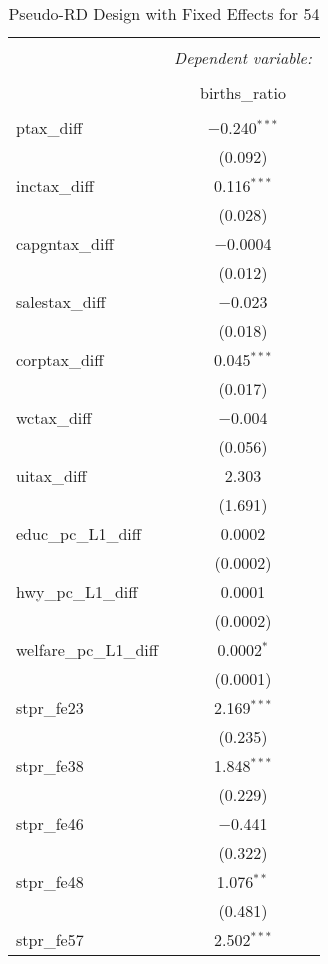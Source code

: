 
\begin{table}[!htbp] \centering 
  \caption{Pseudo-RD Design with Fixed Effects for  54} 
  \label{} 
\begin{tabular}{@{\extracolsep{5pt}}lc} 
\\[-1.8ex]\hline 
\hline \\[-1.8ex] 
 & \multicolumn{1}{c}{\textit{Dependent variable:}} \\ 
\cline{2-2} 
\\[-1.8ex] & births\_ratio \\ 
\hline \\[-1.8ex] 
 ptax\_diff & $-$0.240$^{***}$ \\ 
  & (0.092) \\ 
  inctax\_diff & 0.116$^{***}$ \\ 
  & (0.028) \\ 
  capgntax\_diff & $-$0.0004 \\ 
  & (0.012) \\ 
  salestax\_diff & $-$0.023 \\ 
  & (0.018) \\ 
  corptax\_diff & 0.045$^{***}$ \\ 
  & (0.017) \\ 
  wctax\_diff & $-$0.004 \\ 
  & (0.056) \\ 
  uitax\_diff & 2.303 \\ 
  & (1.691) \\ 
  educ\_pc\_L1\_diff & 0.0002 \\ 
  & (0.0002) \\ 
  hwy\_pc\_L1\_diff & 0.0001 \\ 
  & (0.0002) \\ 
  welfare\_pc\_L1\_diff & 0.0002$^{*}$ \\ 
  & (0.0001) \\ 
  stpr\_fe23 & 2.169$^{***}$ \\ 
  & (0.235) \\ 
  stpr\_fe38 & 1.848$^{***}$ \\ 
  & (0.229) \\ 
  stpr\_fe46 & $-$0.441 \\ 
  & (0.322) \\ 
  stpr\_fe48 & 1.076$^{**}$ \\ 
  & (0.481) \\ 
  stpr\_fe57 & 2.502$^{***}$ \\ 

\end{tabular}
\end{table}
